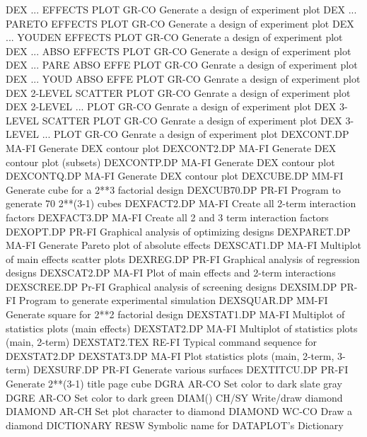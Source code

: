 DEX ... EFFECTS PLOT        GR-CO Generate a design of experiment plot
DEX ... PARETO EFFECTS PLOT GR-CO Generate a design of experiment plot
DEX ... YOUDEN EFFECTS PLOT GR-CO Generate a design of experiment plot
DEX ... ABSO EFFECTS PLOT   GR-CO Generate a design of experiment plot
DEX ... PARE ABSO EFFE PLOT GR-CO Genrate a design of experiment plot
DEX ... YOUD ABSO EFFE PLOT GR-CO Genrate a design of experiment plot
DEX 2-LEVEL SCATTER PLOT    GR-CO Genrate a design of experiment plot
DEX 2-LEVEL ... PLOT        GR-CO Genrate a design of experiment plot
DEX 3-LEVEL SCATTER PLOT    GR-CO Genrate a design of experiment plot
DEX 3-LEVEL ... PLOT        GR-CO Genrate a design of experiment plot
DEXCONT.DP                  MA-FI Generate DEX contour plot
DEXCONT2.DP                 MA-FI Generate DEX contour plot (subsets)
DEXCONTP.DP                 MA-FI Generate DEX contour plot
DEXCONTQ.DP                 MA-FI Generate DEX contour plot
DEXCUBE.DP                  MM-FI Generate cube for a 2**3 factorial design
DEXCUB70.DP                 PR-FI Program to generate 70 2**(3-1) cubes
DEXFACT2.DP                 MA-FI Create all 2-term interaction factors
DEXFACT3.DP                 MA-FI Create all 2 and 3 term interaction factors
DEXOPT.DP                   PR-FI Graphical analysis of optimizing designs
DEXPARET.DP                 MA-FI Generate Pareto plot of absolute effects
DEXSCAT1.DP                 MA-FI Multiplot of main effects scatter plots
DEXREG.DP                   PR-FI Graphical analysis of regression designs
DEXSCAT2.DP                 MA-FI Plot of main effects and 2-term interactions
DEXSCREE.DP                 Pr-FI Graphical analysis of screening designs
DEXSIM.DP                   PR-FI Program to generate experimental simulation
DEXSQUAR.DP                 MM-FI Generate square for 2**2 factorial design
DEXSTAT1.DP                 MA-FI Multiplot of statistics plots (main effects)
DEXSTAT2.DP                 MA-FI Multiplot of statistics plots (main, 2-term)
DEXSTAT2.TEX                RE-FI Typical command sequence for DEXSTAT2.DP
DEXSTAT3.DP                 MA-FI Plot statistics plots (main, 2-term, 3-term)
DEXSURF.DP                  PR-FI Generate various surfaces 
DEXTITCU.DP                 PR-FI Generate 2**(3-1) title page cube
DGRA                        AR-CO Set color to dark slate gray
DGRE                        AR-CO Set color to dark green
DIAM()                      CH/SY Write/draw diamond
DIAMOND                     AR-CH Set plot character to diamond
DIAMOND                     WC-CO Draw a diamond
DICTIONARY                  RESW  Symbolic name for DATAPLOT's Dictionary
